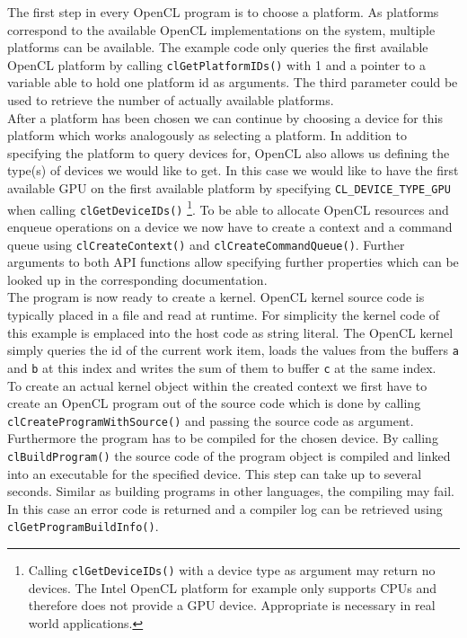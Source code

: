 The first step in every OpenCL program is to choose a platform. As platforms correspond to the available OpenCL implementations on the system, multiple platforms can be available. The example code only queries the first available OpenCL platform by calling \lstinline!clGetPlatformIDs()! with 1 and a pointer to a variable able to hold one platform id as arguments. The third parameter could be used to retrieve the number of actually available platforms. \\
After a platform has been chosen we can continue by choosing a device for this platform which works analogously as selecting a platform. In addition to specifying the platform to query devices for, OpenCL also allows us defining the type(s) of devices we would like to get. In this case we would like to have the first available GPU on the first available platform by specifying \lstinline!CL_DEVICE_TYPE_GPU! when calling \lstinline!clGetDeviceIDs()! \footnote{Calling \lstinline!clGetDeviceIDs()! with a device type as argument may return no devices. The Intel OpenCL platform for example only supports CPUs and therefore does not provide a GPU device. Appropriate is necessary in real world applications.}. To be able to allocate OpenCL resources and enqueue operations on a device we now have to create a context and a command queue using \lstinline!clCreateContext()! and \lstinline!clCreateCommandQueue()!. Further arguments to both API functions allow specifying further properties which can be looked up in the corresponding documentation. \\
The program is now ready to create a kernel. OpenCL kernel source code is typically placed in a file and read at runtime. For simplicity the kernel code of this example is emplaced into the host code as string literal. The OpenCL kernel simply queries the id of the current work item, loads the values from the buffers \lstinline!a! and \lstinline!b! at this index and writes the sum of them to buffer \lstinline!c! at the same index. \\
To create an actual kernel object within the created context we first have to create an OpenCL program out of the source code which is done by calling \lstinline!clCreateProgramWithSource()! and passing the source code as argument. Furthermore the program has to be compiled for the chosen device. By calling \lstinline!clBuildProgram()! the source code of the program object is compiled and linked into an executable for the specified device. This step can take up to several seconds. Similar as building programs in other languages, the compiling may fail. In this case an error code is returned and a compiler log can be retrieved using \lstinline!clGetProgramBuildInfo()!.
